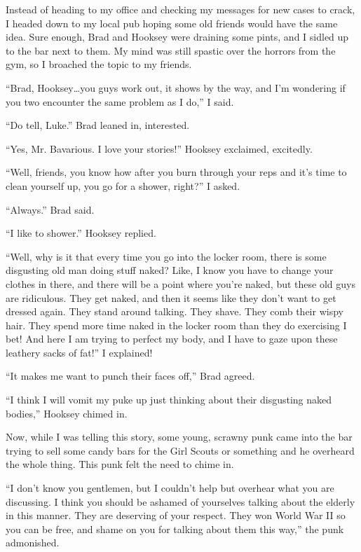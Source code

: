 Instead of heading to my office and checking my messages for new
cases to crack, I headed down to my local pub hoping some old
friends would have the same idea. Sure enough, Brad and Hooksey
were draining some pints, and I sidled up to the bar next to them.
My mind was still spastic over the horrors from the gym, so I
broached the topic to my friends.



``Brad, Hooksey{\ldots}you guys work out, it shows by the way, and I'm
wondering if you two encounter the same problem as I do,'' I
said.



``Do tell, Luke.'' Brad leaned in, interested.

``Yes, Mr. Bavarious. I love your stories!'' Hooksey exclaimed,
excitedly.



``Well, friends, you know how after you burn through your reps and
it's time to clean yourself up, you go for a shower, right?'' I
asked.



``Always.'' Brad said.

``I like to shower.'' Hooksey replied.



``Well, why is it that every time you go into the locker room, there
is some disgusting old man doing stuff naked? Like, I know you have
to change your clothes in there, and there will be a point where
you're naked, but these old guys are ridiculous. They get naked,
and then it seems like they don't want to get dressed again. They
stand around talking. They shave. They comb their wispy hair. They
spend more time naked in the locker room than they do exercising I
bet! And here I am trying to perfect my body, and I have to gaze
upon these leathery sacks of fat!'' I explained!



``It makes me want to punch their faces off,'' Brad agreed.

``I think I will vomit my puke up just thinking about their
disgusting naked bodies,'' Hooksey chimed in.



Now, while I was telling this story, some young, scrawny punk came
into the bar trying to sell some candy bars for the Girl Scouts or
something and he overheard the whole thing. This punk felt the need
to chime in.



``I don't know you gentlemen, but I couldn't help but overhear what
you are discussing. I think you should be ashamed of yourselves
talking about the elderly in this manner. They are deserving of
your respect. They won World War II so you can be free, and shame
on you for talking about them this way,'' the punk admonished.



